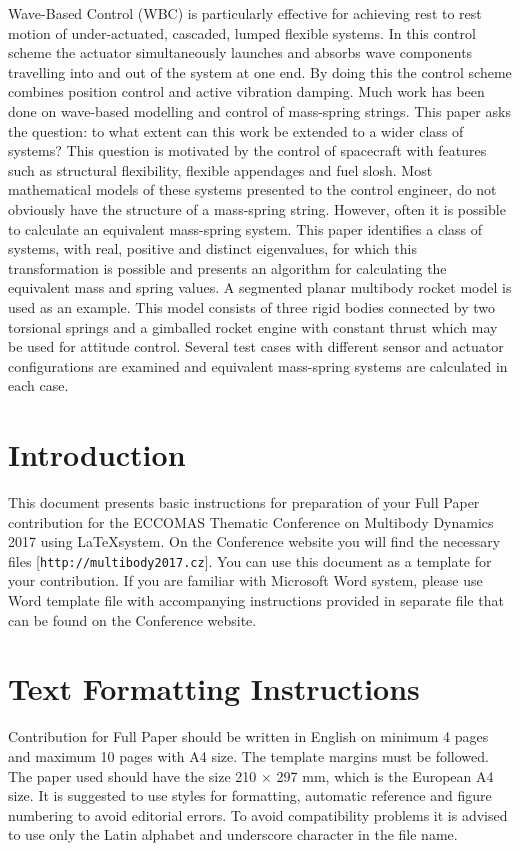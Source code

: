 \documentclass{mbd_fullpaper}
\begin{document}
Wave-Based Control (WBC) is particularly effective for achieving rest to rest motion of under-actuated, cascaded, lumped flexible systems. In this control scheme the actuator simultaneously launches and absorbs wave components travelling into and out of the system at one end. By doing this the control scheme combines position control and active vibration damping. Much work has been done on wave-based modelling and control of mass-spring strings. This paper asks the question: to what extent can this work be extended to a wider class of systems? This question is motivated by the control of spacecraft with features such as structural flexibility, flexible appendages and fuel slosh. Most mathematical models of these systems presented to the control engineer, do not obviously have the structure of a mass-spring string. However, often it is possible to calculate an equivalent mass-spring system. This paper identifies a class of systems, with real, positive and distinct eigenvalues, for which this transformation is possible and presents an algorithm for calculating the equivalent mass and spring values. A segmented planar multibody rocket model is used as an example. This model consists of three rigid bodies connected by two torsional springs and a gimballed rocket engine with constant thrust which may be used for attitude control. Several test cases with different sensor and actuator configurations are examined and equivalent mass-spring systems are calculated in each case.


\section{Introduction}

This document presents basic instructions for preparation of your Full Paper contribution for the ECCOMAS Thematic Conference on Multibody Dynamics 2017 using \LaTeX system. On the Conference website you will find the necessary files [\texttt{http://multibody2017.cz}]. You can use this document as a template for your contribution. If you are familiar with Microsoft Word system, please use Word template file with accompanying instructions provided in separate file that can be found on the Conference website.


\section{Text Formatting Instructions}
Contribution for Full Paper should be written in English on minimum 4 pages and maximum 10 pages with A4 size. The template margins must be followed. The paper used should have the size 210 $\times$ 297 mm, which is the European A4 size. It is suggested to use styles for formatting, automatic reference and figure numbering to avoid editorial errors. To avoid compatibility problems it is advised to use only the Latin alphabet and underscore character in the file name.
\end{document}
